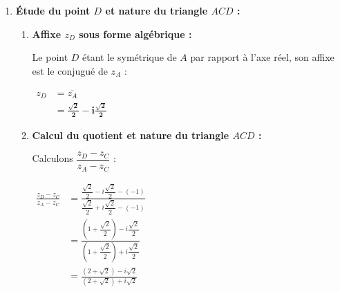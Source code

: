 \documentclass[12pt,a4paper]{article}
\begin{document}
\begin{enumerate}
\begin{enumerate}
        \item \textbf{Placement précis des points $A$, $B$ et $C$ :}
        
        On a $|z_A| = |z_B| = |z_C| = 1$ : les trois points $A$, $B$ et $C$ appartiennent donc au cercle trigonométrique $(\mathcal{C})$ de centre $O$ et de rayon $1$ unité graphique (soit $2\text{ cm}$).
        \begin{itemize}
            \item $C(-1)$ est le point d'intersection de $(\mathcal{C})$ avec le demi-axe réel négatif.
            \item $A\left(e^{i\frac{\pi}{4}}\right)$ est l'intersection de $(\mathcal{C})$ avec la première bissectrice ($y = x$) dans le premier quadrant ($x > 0, y > 0$).
            \item $B\left(e^{-i\frac{3\pi}{4}}\right)$ est le symétrique de $A$ par rapport à l'origine $O$ (intersection de $(\mathcal{C})$ avec la première bissectrice dans le troisième quadrant).
        \end{itemize}
        
        \textit{(Voir la figure complète ci-dessous.)}
    \end{enumerate}

    \item \textbf{Étude du point $D$ et nature du triangle $ACD$ :}
    
    \begin{enumerate}
        \item \textbf{Affixe $z_D$ sous forme algébrique :}
        
        Le point $D$ étant le symétrique de $A$ par rapport à l'axe réel, son affixe est le conjugué de $z_A$ :
        
        $
        \begin{aligned}
            z_D &= \overline{z_A}\\
            &= \mathbf{\frac{\sqrt{2}}{2} - i\frac{\sqrt{2}}{2}}
        \end{aligned}
        $

        \item \textbf{Calcul du quotient et nature du triangle $ACD$ :}
        
        Calculons $\dfrac{z_D - z_C}{z_A - z_C}$ :
        
        $
        \begin{aligned}
            \frac{z_D - z_C}{z_A - z_C} &= \frac{\dfrac{\sqrt{2}}{2} - i\dfrac{\sqrt{2}}{2} - (-1)}{\dfrac{\sqrt{2}}{2} + i\dfrac{\sqrt{2}}{2} - (-1)}\\
            &= \frac{\left(1 + \dfrac{\sqrt{2}}{2}\right) - i\dfrac{\sqrt{2}}{2}}{\left(1 + \dfrac{\sqrt{2}}{2}\right) + i\dfrac{\sqrt{2}}{2}}\\
            &= \frac{(2 + \sqrt{2}) - i\sqrt{2}}{(2 + \sqrt{2}) + i\sqrt{2}}
        \end{aligned}
        $
        

\end{enumerate}
\end{enumerate}
\end{document}
